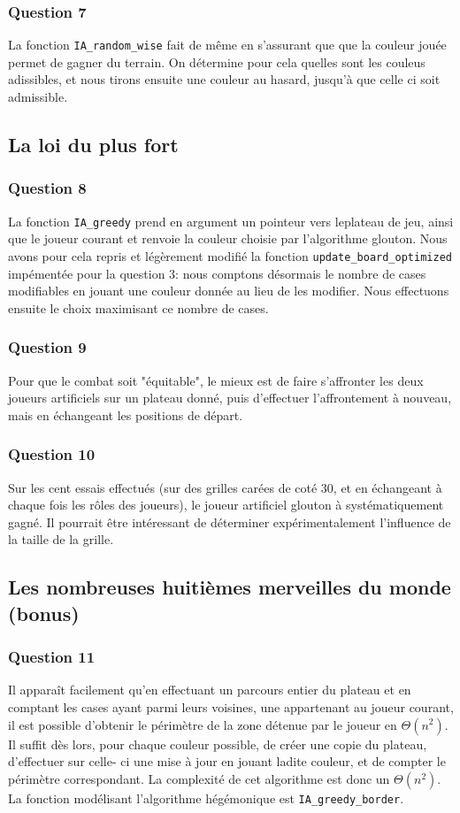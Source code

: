 \documentclass[12pt,a4paper,twoside]{article}
\begin{document}
\subsubsection*{Question 7}
\label{sec:orgheadline14}
La fonction \texttt{IA\_random\_wise} fait de même en s'assurant que
que la couleur jouée permet de gagner du terrain. On détermine pour
cela quelles sont les couleus adissibles, et nous tirons ensuite
une couleur au hasard, jusqu'à que celle ci soit admissible.
\subsection{La loi du plus fort}
\label{sec:orgheadline19}
\subsubsection*{Question 8}
\label{sec:orgheadline16}
La fonction \texttt{IA\_greedy} prend en argument un pointeur vers
leplateau de jeu, ainsi que le joueur courant et renvoie la couleur
choisie par l'algorithme glouton.  Nous avons pour cela repris et
légèrement modifié la fonction \texttt{update\_board\_optimized}
impémentée pour la question 3: nous comptons désormais le nombre de
cases modifiables en jouant une couleur donnée au lieu de les
modifier. Nous effectuons ensuite le choix maximisant ce nombre de
cases.
\subsubsection*{Question 9}
\label{sec:orgheadline17}
Pour que le combat soit "équitable", le mieux est de faire s'affronter
les deux joueurs artificiels sur un plateau donné, puis d'effectuer
l'affrontement à nouveau, mais en échangeant les positions de départ.
\subsubsection*{Question 10}
\label{sec:orgheadline18}
Sur les cent essais effectués (sur des grilles carées de coté 30, et
en échangeant à chaque fois les rôles des joueurs), le
joueur artificiel glouton à systématiquement gagné. 
Il pourrait être intéressant de déterminer expérimentalement
l'influence de la taille de la grille.
\subsection{Les nombreuses huitièmes merveilles du monde (bonus)}
\label{sec:orgheadline22}
\subsubsection*{Question 11}
\label{sec:orgheadline20}
Il apparaît facilement qu'en effectuant un parcours entier du plateau
et en comptant les cases ayant parmi leurs voisines, une appartenant au
joueur courant, il est possible d'obtenir le périmètre de la zone
détenue par le joueur en \(\Theta(n^{2})\). Il suffit dès lors, pour chaque
couleur possible, de créer une copie du plateau, d'effectuer sur celle-
ci une mise à jour en jouant ladite couleur, et de compter le
périmètre correspondant.
La complexité de cet algorithme est donc un \(\Theta(n^{2})\).
La fonction modélisant l'algorithme hégémonique est
\texttt{IA\_greedy\_border}.
\end{document}
